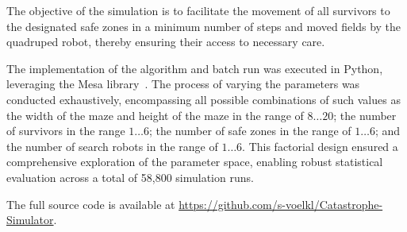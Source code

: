 \documentclass[3p,times,procedia]{elsarticle}
\begin{document}
The objective of the simulation is to facilitate the movement of all survivors to the designated safe zones in a minimum
number of steps and moved fields by the quadruped robot, thereby ensuring their access to necessary care.

The implementation of the algorithm and batch run was executed in Python, leveraging the Mesa library\ \cite{Hoeven2025mesa}.
The process of varying the parameters was conducted exhaustively, encompassing all possible combinations of such values as  the width of the maze and height of the maze in the range of $8 \ldots 20$; the number of survivors in the range $1 \ldots 6$; the number of safe zones in the range of $1 \ldots 6$; and the number of search robots in the range of $1 \ldots 6$. This factorial design ensured a comprehensive exploration of the parameter space, enabling robust statistical evaluation across a total of 58,800 simulation runs.


The full source code is available at \url{https://github.com/s-voelkl/Catastrophe-Simulator}.

\end{document}
